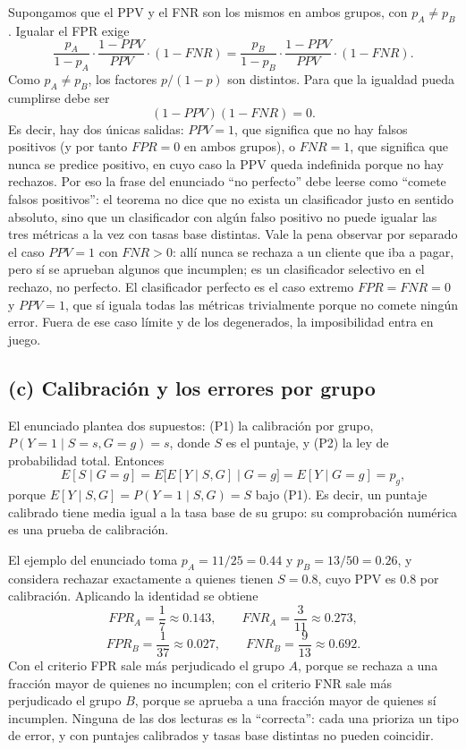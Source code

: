 Supongamos que el PPV y el FNR son los mismos en ambos grupos, con
$p_A\neq p_B$. Igualar el FPR exige
\[
\frac{p_A}{1-p_A}\cdot\frac{1-PPV}{PPV}\cdot(1-FNR)
   =\frac{p_B}{1-p_B}\cdot\frac{1-PPV}{PPV}\cdot(1-FNR).
\]
Como $p_A\neq p_B$, los factores $p/(1-p)$ son distintos. Para que la
igualdad pueda cumplirse debe ser
\[
(1-PPV)(1-FNR)=0.
\]
Es decir, hay dos únicas salidas: $PPV=1$, que significa que no hay falsos
positivos (y por tanto $FPR=0$ en ambos grupos), o $FNR=1$, que significa que
nunca se predice positivo, en cuyo caso la PPV queda indefinida porque no hay
rechazos. Por eso la frase del enunciado ``no perfecto'' debe leerse como
``comete falsos positivos'': el teorema no dice que no exista un clasificador
justo en sentido absoluto, sino que un clasificador con algún falso positivo
no puede igualar las tres métricas a la vez con tasas base distintas. Vale
la pena observar por separado el caso $PPV=1$ con $FNR>0$: allí nunca se
rechaza a un cliente que iba a pagar, pero sí se aprueban algunos que
incumplen; es un clasificador selectivo en el rechazo, no perfecto. El
clasificador perfecto es el caso extremo $FPR=FNR=0$ y $PPV=1$, que sí iguala
todas las métricas trivialmente porque no comete ningún error. Fuera de ese
caso límite y de los degenerados, la imposibilidad entra en juego.

\subsection*{(c) Calibración y los errores por grupo}

El enunciado plantea dos supuestos: (P1) la calibración por grupo,
$P(Y=1\mid S=s,G=g)=s$, donde $S$ es el puntaje, y (P2) la ley de
probabilidad total. Entonces
\[
E[S\mid G=g]=E\bigl[E[Y\mid S,G]\mid G=g\bigr]=E[Y\mid G=g]=p_g,
\]
porque $E[Y\mid S,G]=P(Y=1\mid S,G)=S$ bajo (P1). Es decir, un puntaje
calibrado tiene media igual a la tasa base de su grupo: su comprobación
numérica es una prueba de calibración.

El ejemplo del enunciado toma $p_A=11/25=0.44$ y $p_B=13/50=0.26$, y
considera rechazar exactamente a quienes tienen $S=0.8$, cuyo PPV es $0.8$
por calibración. Aplicando la identidad se obtiene
\[
FPR_A=\frac{1}{7}\approx 0.143,\qquad
FNR_A=\frac{3}{11}\approx 0.273,
\]
\[
FPR_B=\frac{1}{37}\approx 0.027,\qquad
FNR_B=\frac{9}{13}\approx 0.692.
\]
Con el criterio FPR sale más perjudicado el grupo $A$, porque se rechaza a
una fracción mayor de quienes no incumplen; con el criterio FNR sale más
perjudicado el grupo $B$, porque se aprueba a una fracción mayor de quienes
sí incumplen. Ninguna de las dos lecturas es la ``correcta'': cada una
prioriza un tipo de error, y con puntajes calibrados y tasas base distintas
no pueden coincidir.

